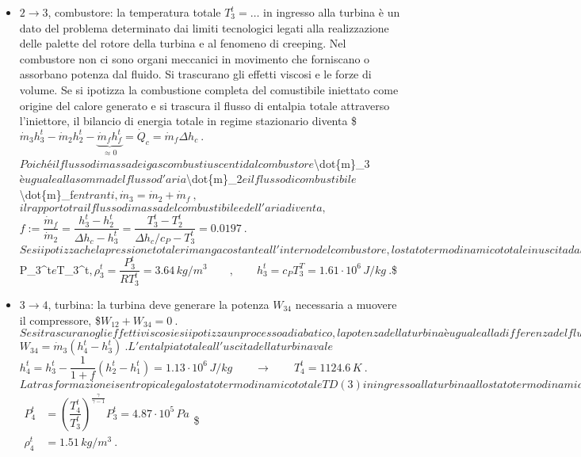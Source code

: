 \documentclass[letterpaper,10pt,italian]{jupyterBook}
\begin{document}
\begin{itemize}
\item {} 
\sphinxAtStartPar
\(2 \rightarrow 3\), combustore: la temperatura totale \(T_3^t = \dots\)
in ingresso alla turbina è un dato del problema determinato dai
limiti tecnologici legati alla realizzazione delle palette del
rotore della turbina e al fenomeno di creeping. Nel combustore non
ci sono organi meccanici in movimento che forniscano o assorbano
potenza dal fluido. Si trascurano gli effetti viscosi e le forze di
volume. Se si ipotizza la combustione completa del comustibile
iniettato come origine del calore generato e si trascura il flusso
di entalpia totale attraverso l’iniettore, il bilancio di energia
totale in regime stazionario diventa
\$\(\dot{m}_3 h_3^t - \dot{m}_2 h_2^t - \underbrace{\dot{m}_f h_f^t}_{\approx 0} = \dot{Q}_c = \dot{m}_f \Delta h_c
 \ .\)\( Poiché il flusso di massa dei gas combusti uscenti dal
combustore \)\textbackslash{}dot\{m\}\_3\( è uguale alla somma del flusso d'aria
\)\textbackslash{}dot\{m\}\_2\( e il flusso di combustibile \)\textbackslash{}dot\{m\}\_f\( entranti,
\)\(\dot{m}_3 = \dot{m}_2 + \dot{m}_f \ ,\)\( il rapporto tra il flusso
di massa del combustibile e dell'aria diventa,
\)\(f := \dfrac{\dot{m}_f}{\dot{m}_2}
    = \dfrac{h_3^t - h_2^t}{\Delta h_c - h_3^t}
    = \dfrac{T_3^t - T_2^t}{\Delta h_c / c_P - T_3^t} = 0.0197  \ .\)\(
Se si ipotizza che la pressione totale rimanga costante all'interno
del combustore, lo stato termodinamico totale in uscita dal
combustore è determinato dal valore della pressione e della
temperatura totale, \)P\_3\textasciicircum{}t\( e \)T\_3\textasciicircum{}t\(,
\)\(\rho_3^t = \dfrac{P_3^t}{R T_3^t} = 3.64 \, kg/m^3 \qquad , \qquad h_3^t = c_P T_3^T = 1.61 \cdot 10^6 \, J/kg \ .\)\$

\item {} 
\sphinxAtStartPar
\(3 \rightarrow 4\), turbina: la turbina deve generare la potenza
\(W_{34}\) necessaria a muovere il compressore,
\$\(W_{12} + W_{34} = 0 \ .\)\( Se si trascurano gli effetti viscosi e
si ipotizza un processo adiabatico, la potenza della turbina è
uguale alla differenza del flusso di entalpia totale tra l'uscita e
l'ingresso della turbina,
\)\(W_{34} = \dot{m}_3 ( h_4^t - h_3^t ) \ .\)\( L'entalpia totale
all'uscita della turbina vale
\)\(h_4^t = h_3^t - \dfrac{1}{1+f} ( h_2^t - h_1^t ) = 1.13 \cdot 10^6 \, J/kg 
\qquad \rightarrow \qquad T_4^t = 1124.6 \, K \ .\)\( La
trasformazione isentropica lega lo stato termodinamico totale TD(3)
in ingresso alla turbina allo stato termodinamico totale TD(4) in
uscita, \)\(\begin{aligned}
 P_4^t & = \left(\dfrac{T_4^t}{T_3^t} \right)^{\frac{\gamma}{\gamma-1}} P_3^t = 4.87 \cdot 10^5 \, Pa \\
 \rho_4^t & = 1.51 \, kg/m^3 \ .
\end{aligned}\)\$


\end{itemize}
\end{document}
